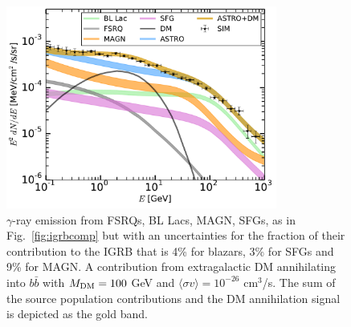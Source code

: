 \documentclass[12 pt]{article}
\begin{document}
\begin{figure} %
 \centering
  \includegraphics[width=3.5in]{money_plot_proposal.pdf} 
\vspace{-0.7cm}
   \caption{$\gamma$-ray emission from FSRQs, BL Lacs, MAGN, SFGs, as in Fig.~\ref{fig:igrbcomp} but with an uncertainties for the fraction of their contribution to the IGRB that is 4\% for blazars, 3\% for SFGs and 9\% for MAGN. A contribution from extragalactic DM annihilating into $b\bar{b}$ with $M_{\rm{DM}}=100$ GeV and $\langle \sigma v \rangle = 10^{-26}$ cm$^3$/s. The sum of the source population contributions and the DM annihilation signal is depicted as the gold band.}
   \label{fig:moneyplot}
\end{figure}




\vspace{-0.5cm}
\end{document}
